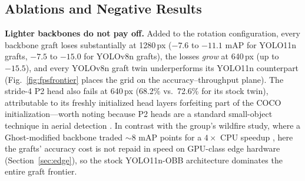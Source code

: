 \documentclass[conference]{IEEEtran}
\newcommand{\dd}{Defective Damper}
\begin{document}
\subsection{Ablations and Negative Results}
\label{sec:ablations}
\textbf{Lighter backbones do not pay off.} Added to the rotation configuration, every backbone graft loses substantially at 1280\,px ($-7.6$ to $-11.1$ mAP for YOLO11n grafts, $-7.5$ to $-15.0$ for YOLOv8n grafts), the losses \emph{grow} at 640\,px (up to $-15.5$), and every YOLOv8n graft twin underperforms its YOLO11n counterpart (Fig.~\ref{fig:fpsfrontier} places the grid on the accuracy--throughput plane). The stride-4 P2 head also fails at 640\,px (68.2\% vs.\ 72.6\% for its stock twin), attributable to its freshly initialized head layers forfeiting part of the COCO initialization---worth noting because P2 heads are a standard small-object technique in aerial detection \cite{laf2026yolo}. In contrast with the group's wildfire study, where a Ghost-modified backbone traded ${\sim}8$ mAP points for a $4\times$ CPU speedup \cite{vazquez2026wildfire}, here the grafts' accuracy cost is not repaid in speed on GPU-class edge hardware (Section~\ref{sec:edge}), so the stock YOLO11n-OBB architecture dominates the entire graft frontier.

\end{document}
